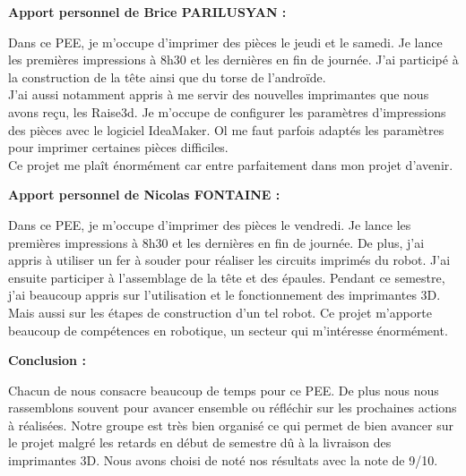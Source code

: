 \documentclass[12pt, oneside]{article}
\begin{document}
\vspace{1cm}
\textcolor{bleu}{\Large{\textbf{Apport personnel de Brice PARILUSYAN :}}}
\vspace{0.5cm}

Dans ce PEE, je m'occupe d'imprimer des pièces le jeudi et le samedi. Je lance les premières impressions à 8h30 et les dernières en fin de journée. J'ai participé à la construction de la tête ainsi que du torse de l'androïde. \\
J'ai aussi notamment appris à me servir des nouvelles imprimantes que nous avons reçu, les Raise3d. Je m'occupe de configurer les paramètres d'impressions des pièces avec le logiciel IdeaMaker. Ol me faut parfois adaptés les paramètres pour imprimer certaines pièces difficiles.\\
Ce projet me plaît énormément car entre parfaitement dans mon projet d'avenir.



\vspace{1cm}
\textcolor{bleu}{\Large{\textbf{Apport personnel de Nicolas FONTAINE :}}}
\vspace{0.5cm}

Dans ce PEE, je m'occupe d'imprimer des pièces le vendredi. Je lance les premières impressions à 8h30 et les dernières en fin de journée.
De plus, j'ai appris à utiliser un fer à souder pour réaliser les circuits imprimés du robot. J'ai ensuite participer à l'assemblage de la tête et des épaules.
\newline
Pendant ce semestre, j'ai beaucoup appris sur l'utilisation et le fonctionnement des imprimantes 3D. Mais aussi sur les étapes de construction d'un tel robot.
\newline
Ce projet m'apporte beaucoup de compétences en robotique, un secteur qui m'intéresse énormément. 

\vspace{1cm}
\textcolor{bleu}{\Large{\textbf{Conclusion :}}}
\vspace{0.5cm}

Chacun de nous consacre beaucoup de temps pour ce PEE. De plus nous nous rassemblons souvent pour avancer ensemble ou réfléchir sur les prochaines actions à réalisées. Notre groupe est très bien organisé ce qui permet de bien avancer sur le projet malgré les retards en début de semestre dû à la livraison des imprimantes 3D.
\newline
Nous avons choisi de noté nos résultats avec la note de 9/10.
\end{document}
